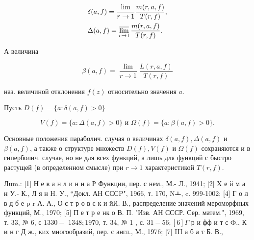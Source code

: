 \documentclass[10pt]{article}
\begin{document}
\[

\begin{aligned}

& \delta(a, f)=\frac{\lim }{r \rightarrow 1} \frac{m(r, a, f)}{T(r, f)}, \\

& \Delta(a, f)=\varlimsup_{r \rightarrow 1} \frac{m(r, a, f)}{T(r, f)} .

\end{aligned}

\]



А величина



\[

\beta(a, f)=\frac{\lim }{r \rightarrow 1} \frac{L(r, a, f)}{T(r, f)}

\]



наз. величиной отклонения $f(z)$ относительно значения $a$.



Пусть $D(f)=\{a: \delta(a, f)>0\}$



\[

V(f)=\{a: \Delta(a, f)>0\} \text { и } \Omega(f)=\{a: \beta(a, f)>0\} .

\]



Основные положения параболич. случая о величинах $\delta(a, f), \Delta(a, f)$ и $\beta(a, f)$, а также о структуре множеств $D(f), V(f)$ и $\Omega(f)$ сохраняются и в гиперболич. случае, но не для всех функций, а лишь для функций с быстро растущей (в определенном смысле) при $r \rightarrow 1$ характеристикой $T(r, f)$.



Лum.: [1] Н е в а н л и н н а Р Функции, пер. с нем., М.- Л., 1941; [2] Х е й м а н У.- К., Л я н Н. У., “Докл. АН СССP", 1966, т. 170, Nㅗ, c. 999-1002; [4] Г о л в д б е p r А. А., О с т р о в с к и йИ. В., распределение значений мероморфных функций, М., 1970; [5] П е т р е нк о В. П. "Изв. АН СССР. Сер. матем.", 1969, т. 33, № 6, с $1330-$ $1348 ; 1970$, т. 34, № 1 , с. $31-56 ;[6] \Gamma$ р и фф и т с Ф., К и н г Д ж., ких многообразий, пер. с англ., М., 1976; [7] III а б а т Б. В.,
\end{document}
